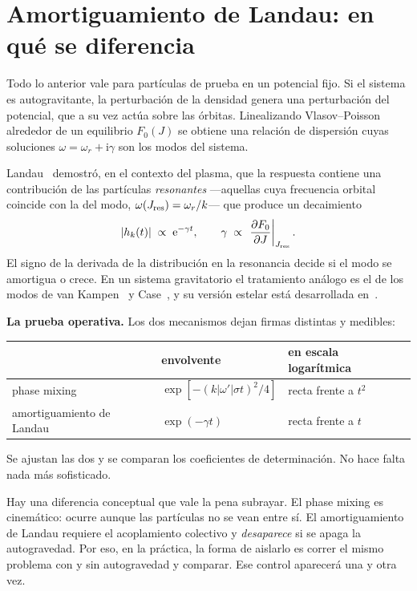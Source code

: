 \documentclass[11pt,a4paper]{article}
\newcommand{\ee}{\mathrm{e}}
\newcommand{\ii}{\mathrm{i}}
\newcommand{\Jr}{J}
\theoremstyle{definition}
\begin{document}
\section{Amortiguamiento de Landau: en qué se diferencia}
\label{sec:landau}

Todo lo anterior vale para partículas de prueba en un potencial fijo. Si el
sistema es autogravitante, la perturbación de la densidad genera una perturbación
del potencial, que a su vez actúa sobre las órbitas. Linealizando Vlasov--Poisson
alrededor de un equilibrio $F_0(\Jr)$ se obtiene una relación de dispersión cuyas
soluciones $\omega = \omega_r + \ii\gamma$ son los modos del sistema.

Landau~\cite{landau1946} demostró, en el contexto del plasma, que la respuesta
contiene una contribución de las partículas \emph{resonantes} ---aquellas cuya
frecuencia orbital coincide con la del modo, $\omega(\Jr_{\rm res}) = \omega_r/k$---
que produce un decaimiento
\begin{equation}
  |h_k(t)| \;\propto\; \ee^{-\gamma t},
  \qquad
  \gamma \;\propto\; \left.\frac{\partial F_0}{\partial \Jr}\right|_{\Jr_{\rm res}} .
  \label{eq:landau}
\end{equation}
El signo de la derivada de la distribución en la resonancia decide si el modo se
amortigua o crece. En un sistema gravitatorio el tratamiento análogo es el de los
modos de van Kampen~\cite{vankampen1955} y Case~\cite{case1959}, y su versión
estelar está desarrollada en~\cite[\S5.5]{binney2008}.

\begin{idea}
\textbf{La prueba operativa.} Los dos mecanismos dejan firmas distintas y medibles:
\begin{center}
\begin{tabular}{lll}
\toprule
 & envolvente & en escala logarítmica \\
\midrule
phase mixing              & $\exp[-(k|\omega'|\sigma t)^2/4]$ & recta frente a $t^2$ \\
amortiguamiento de Landau & $\exp(-\gamma t)$                 & recta frente a $t$ \\
\bottomrule
\end{tabular}
\end{center}
Se ajustan las dos y se comparan los coeficientes de determinación. No hace falta
nada más sofisticado.
\end{idea}

Hay una diferencia conceptual que vale la pena subrayar. El phase mixing es
cinemático: ocurre aunque las partículas no se vean entre sí. El amortiguamiento de
Landau requiere el acoplamiento colectivo y \emph{desaparece} si se apaga la
autogravedad. Por eso, en la práctica, la forma de aislarlo es correr el mismo
problema con y sin autogravedad y comparar. Ese control aparecerá una y otra vez.
\end{document}
